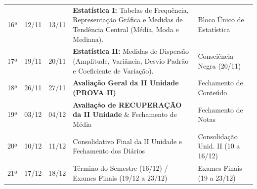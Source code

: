 \documentclass[10pt,a4paper]{article}
\begin{document}
\begin{longtable}{p{0.8cm} p{1.8cm} p{1.8cm} p{7.5cm} p{4.2cm}}
\rowcolor{lightgrey}
16ª & 12/11 & 13/11 & \textbf{Estatística I:} Tabelas de Frequência, Representação Gráfica e Medidas de Tendência Central (Média, Moda e Mediana). & Bloco Único de Estatística \\
17ª & 19/11 & 20/11 & \textbf{Estatística II:} Medidas de Dispersão (Amplitude, Variância, Desvio Padrão e Coeficiente de Variação). & Consciência Negra (20/11) \\
\rowcolor{lightgrey}
18ª & 26/11 & 27/11 & \textbf{Avaliação Geral da II Unidade (PROVA II)} & Fechamento de Conteúdo \\
19ª & 03/12 & 04/12 & \textbf{Avaliação de RECUPERAÇÃO da II Unidade} \& Fechamento de Média & Fechamento de Notas \\
\rowcolor{lightgrey}
20ª & 10/12 & 11/12 & Consolidativo Final da II Unidade e Fechamento dos Diários & Consolidação Unid. II (10 a 16/12) \\
21ª & 17/12 & 18/12 & Término do Semestre (16/12) / Exames Finais (19/12 a 23/12) & Exames Finais (19 a 23/12) \\

\end{longtable}
\end{document}
